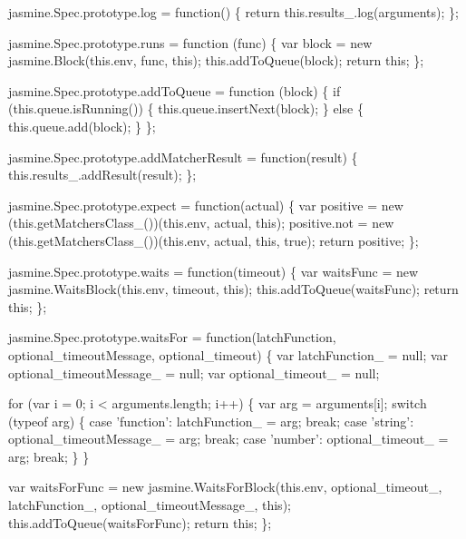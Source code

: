 \begin{DoxyCodeInclude}
jasmine.Spec.prototype.log = \textcolor{keyword}{function}() \{
  \textcolor{keywordflow}{return} this.results\_.log(arguments);
\};

jasmine.Spec.prototype.runs = \textcolor{keyword}{function} (func) \{
  var block = \textcolor{keyword}{new} jasmine.Block(this.env, func, \textcolor{keyword}{this});
  this.addToQueue(block);
  \textcolor{keywordflow}{return} \textcolor{keyword}{this};
\};

jasmine.Spec.prototype.addToQueue = \textcolor{keyword}{function} (block) \{
  \textcolor{keywordflow}{if} (this.queue.isRunning()) \{
    this.queue.insertNext(block);
  \} \textcolor{keywordflow}{else} \{
    this.queue.add(block);
  \}
\};

jasmine.Spec.prototype.addMatcherResult = \textcolor{keyword}{function}(result) \{
  this.results\_.addResult(result);
\};

jasmine.Spec.prototype.expect = \textcolor{keyword}{function}(actual) \{
  var positive = \textcolor{keyword}{new} (this.getMatchersClass\_())(this.env, actual, \textcolor{keyword}{this});
  positive.not = \textcolor{keyword}{new} (this.getMatchersClass\_())(this.env, actual, \textcolor{keyword}{this}, \textcolor{keyword}{true});
  \textcolor{keywordflow}{return} positive;
\};

jasmine.Spec.prototype.waits = \textcolor{keyword}{function}(timeout) \{
  var waitsFunc = \textcolor{keyword}{new} jasmine.WaitsBlock(this.env, timeout, \textcolor{keyword}{this});
  this.addToQueue(waitsFunc);
  \textcolor{keywordflow}{return} \textcolor{keyword}{this};
\};

jasmine.Spec.prototype.waitsFor = \textcolor{keyword}{function}(latchFunction, optional\_timeoutMessage, optional\_timeout) \{
  var latchFunction\_ = null;
  var optional\_timeoutMessage\_ = null;
  var optional\_timeout\_ = null;

  \textcolor{keywordflow}{for} (var i = 0; i < arguments.length; i++) \{
    var arg = arguments[i];
    \textcolor{keywordflow}{switch} (typeof arg) \{
      \textcolor{keywordflow}{case} \textcolor{stringliteral}{'function'}:
        latchFunction\_ = arg;
        \textcolor{keywordflow}{break};
      \textcolor{keywordflow}{case} \textcolor{stringliteral}{'string'}:
        optional\_timeoutMessage\_ = arg;
        \textcolor{keywordflow}{break};
      \textcolor{keywordflow}{case} \textcolor{stringliteral}{'number'}:
        optional\_timeout\_ = arg;
        \textcolor{keywordflow}{break};
    \}
  \}

  var waitsForFunc = \textcolor{keyword}{new} jasmine.WaitsForBlock(this.env, optional\_timeout\_, latchFunction\_, 
      optional\_timeoutMessage\_, \textcolor{keyword}{this});
  this.addToQueue(waitsForFunc);
  \textcolor{keywordflow}{return} \textcolor{keyword}{this};
\};


\end{DoxyCodeInclude}
